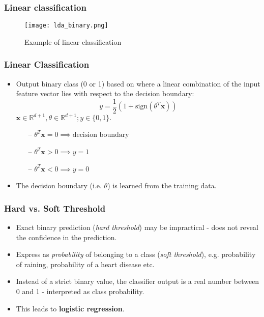 \begin{frame}
\frametitle{Linear classification}
\begin{figure}
\texttt{[image: lda\_binary.png]}
\caption{Example of linear classification}
\end{figure}
\end{frame}
\begin{frame}
\frametitle{Linear Classification}
\begin{itemize}
\item Output binary class (0 or 1) based on where a linear combination of the input feature vector lies with respect to the decision boundary:
\begin{equation}
y = \frac{1}{2}(1 + \text{sign} (\theta^T \mathbf{x}))
\end{equation}
$\mathbf{x} \in \mathds{R}^{d+1}, \theta \in \mathds{R}^{d+1}; y \in \{0,1\}.$\\

\begin{itemize}
\item[--] $ \theta^T \mathbf{x} = 0 \implies \text{decision boundary}$
\item[--] $ \theta^T \mathbf{x} > 0 \implies y = 1$
\item[--] $ \theta^T \mathbf{x}  < 0 \implies y = 0$
\end{itemize}

\item The decision boundary (i.e. $\theta$) is learned from the training data.
\end{itemize}
\end{frame}

\begin{frame}
\frametitle{Hard vs. Soft Threshold}
\begin{itemize}
\item Exact binary prediction (\textit{hard threshold}) may be impractical - does not reveal the confidence in the prediction.
\item Express as \textit{probability} of belonging to a class (\textit{soft threshold}), e.g. probability of raining, probability of a heart disease etc. \item Instead of a strict binary value, the classifier output is a real number between 0 and 1 - interpreted as class probability.
\item This leads to \textbf{logistic regression}.
\end{itemize}
\end{frame}

